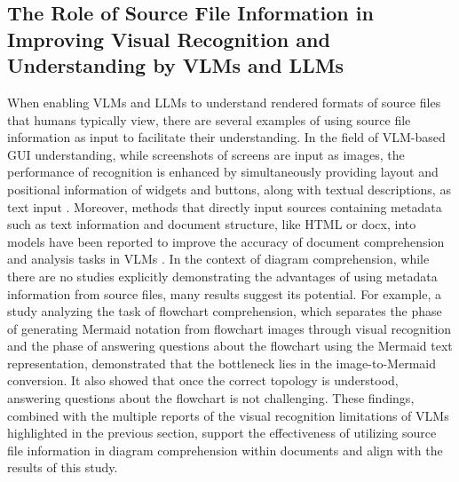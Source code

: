 \subsection{The Role of Source File Information in Improving Visual Recognition and Understanding by VLMs and LLMs}
When enabling VLMs and LLMs to understand rendered formats of source files that humans typically view, there are several examples of using source file information as input to facilitate their understanding. 
In the field of VLM-based GUI understanding, while screenshots of screens are input as images, the performance of recognition is enhanced by simultaneously providing layout and positional information of widgets and buttons, along with textual descriptions, as text input \cite{you_ferret-ui_2024, li2024ferret}. Moreover, methods that directly input sources containing metadata such as text information and document structure, like HTML or docx, into models have been reported to improve the accuracy of document comprehension and analysis tasks in VLMs \cite{xu2020layoutlmv2, huang2022layoutlmv3, tan2024htmlrag}.
In the context of diagram comprehension, while there are no studies explicitly demonstrating the advantages of using metadata information from source files, many results suggest its potential. For example, a study analyzing the task of flowchart comprehension, which separates the phase of generating Mermaid notation from flowchart images through visual recognition and the phase of answering questions about the flowchart using the Mermaid text representation, demonstrated that the bottleneck lies in the image-to-Mermaid conversion\cite{ye_beyond_2024, pan_flowlearn_2024}. It also showed that once the correct topology is understood, answering questions about the flowchart is not challenging. These findings, combined with the multiple reports of the visual recognition limitations of VLMs highlighted in the previous section, support the effectiveness of utilizing source file information in diagram comprehension within documents and align with the results of this study.
